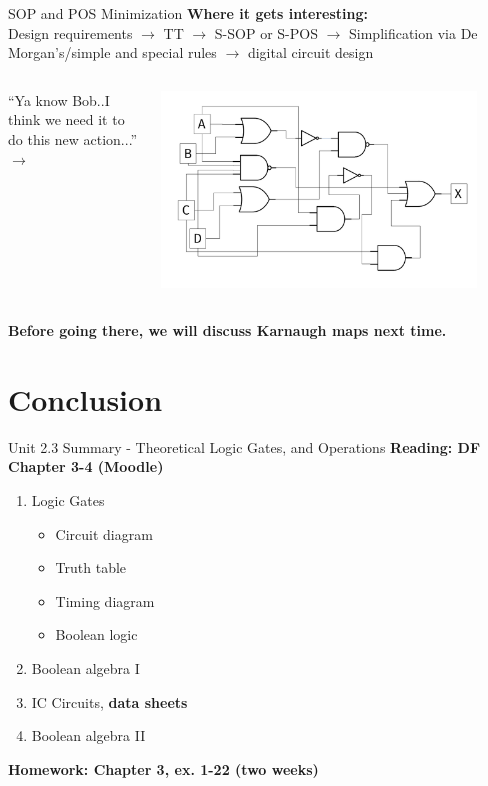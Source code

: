\documentclass{beamer}
\begin{document}
\begin{frame}{SOP and POS Minimization}
\textbf{Where it gets interesting:} \\ \vspace{0.5cm}
Design requirements $\rightarrow$ TT $\rightarrow$ S-SOP or S-POS $\rightarrow$ Simplification via De Morgan's/simple and special rules $\rightarrow$ digital circuit design \\ \vspace{0.5cm}
\begin{columns}[T]
\small
\begin{column}{0.5\textwidth}
``Ya know Bob..I think we need it to do this new action...'' $\rightarrow$
\end{column}
\begin{column}{0.5\textwidth}
\includegraphics[width=0.9\textwidth]{figures/MultiGate2.pdf}
\end{column}
\end{columns}
\textbf{Before going there, we will discuss Karnaugh maps next time.}
\end{frame}

\section{Conclusion}

\begin{frame}{Unit 2.3 Summary - Theoretical Logic Gates, and Operations}
\textbf{Reading: DF Chapter 3-4 (Moodle)}
\begin{enumerate}
\item Logic Gates
\begin{itemize}
\item Circuit diagram
\item Truth table
\item Timing diagram
\item Boolean logic
\end{itemize}
\item \alert{Boolean algebra I}
\item IC Circuits, \textbf{data sheets}
\item \alert{Boolean algebra II}
\end{enumerate}
\textbf{Homework: Chapter 3, ex. 1-22 (two weeks)}
\end{frame}
\end{document}
